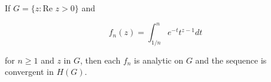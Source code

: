 If $G = \{z: \text{Re } z > 0\}$ and

$$f_n(z) = \int_{1/n}^{n} e^{-t} t^{z-1} dt$$

for $n \geq 1$ and $z$ in $G$, then each $f_n$ is analytic on $G$ and the sequence is convergent in $H(G)$.